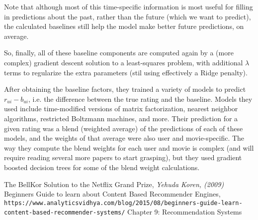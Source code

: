 \documentclass[11pt]{article}
\begin{document}
Note that although most of this time-specific information is most useful for filling in predictions about the past, rather than the future (which we want to predict), the calculated baselines still help the model make better future predictions, on average.

So, finally, all of these baseline components are computed again by a (more complex) gradient descent solution to a least-squares problem, with additional $\lambda$ terms to regularize the extra parameters (stil using effectively a Ridge penalty).

After obtaining the baseline factors, they trained a variety of models to predict $r_{ui} - b_{ui}$, i.e. the difference between the true rating and the baseline. Models they used include time-modified versions of matrix factorization, nearest neighbor algorithms, restricted Boltzmann machines, and more. Their prediction for a given rating was a blend (weighted average) of the predictions of each of these models, and the weights of that average were also user and movie-specific. The way they compute the blend weights for each user and movie is complex (and will require reading several more papers to start grasping), but they used gradient boosted decision trees for some of the blend weight calculations.

\begin{thebibliography}{9}
The BellKor Solution to the Netflix Grand Prize,
\textit{Yehuda Koren, (2009)}
Beginners Guide to learn about Content Based Recommender Engines,
\\\texttt{https://www.analyticsvidhya.com/blog/2015/08/beginners-guide-learn-content-based-recommender-systems/}
Chapter 9: Recommendation Systems
\end{thebibliography}
\end{document}
